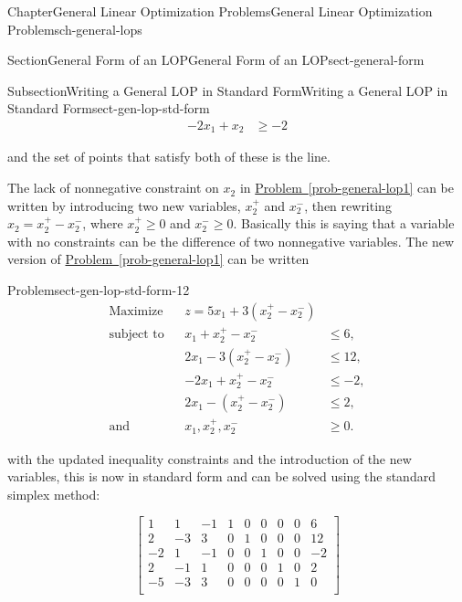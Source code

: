\documentclass[oneside,10pt,]{book}
\newcommand{\xreffont}{\relax}
\numberwithin{equation}{section}
\newcommand{\amp}{&}
\begin{document}
\begin{chapterptx}{Chapter}{General Linear Optimization Problems}{}{General Linear Optimization Problems}{}{}{ch-general-lops}
\begin{sectionptx}{Section}{General Form of an LOP}{}{General Form of an LOP}{}{}{sect-general-form}
\begin{subsectionptx}{Subsection}{Writing a General LOP in Standard Form}{}{Writing a General LOP in Standard Form}{}{}{sect-gen-lop-std-form}
\begin{align*}
-2 x_1 + x_2 \amp \geq -2
\end{align*}
%
\par
and the set of points that satisfy both of these is the line.%
\par
The lack of nonnegative constraint on \(x_2\) in \hyperref[prob-general-lop1]{Problem~{\xreffont\ref{prob-general-lop1}}} can be written by introducing two new variables, \(x_2^+\) and \(x_2^-\), then rewriting \(x_2 = x_2^+-x_2^-\), where \(x_2^+ \geq 0\) and \(x_2^- \geq 0\). Basically this is saying that a variable with no constraints can be the difference of two nonnegative variables. The new version of \hyperref[prob-general-lop1]{Problem~{\xreffont\ref{prob-general-lop1}}} can be written%
\begin{problem}{Problem}{}{sect-gen-lop-std-form-12}%
%
\begin{equation*}
\begin{aligned} \text{Maximize} \amp\amp z = 5x_1 +3(x_2^+ - x_2^-) \amp \\ \text{subject to} \amp\amp x_1 + x_2^+ - x_2^- \amp \leq 6, \\ \amp\amp 2x_1 -3(x_2^+ - x_2^-)  \amp \leq 12, \\ \amp\amp -2x_1 + x_2^+ - x_2^- \amp\leq -2, \\ \amp\amp 2x_1 - (x_2^+ - x_2^-) \amp \leq 2, \\ \text{and}\amp\amp x_1, x_2^+, x_2^- \amp \geq 0.
\end{aligned}
\end{equation*}
%
\end{problem}
with the updated inequality constraints and the introduction of the new variables, this is now in standard form and can be solved using the standard simplex method:%
\par
%
\begin{equation*}
\left[\begin{array}{rrr|rrrrr|r} 1 \amp 1 \amp -1 \amp 1 \amp 0 \amp 0 \amp 0 \amp 0 \amp 6\\ 2 \amp -3 \amp 3 \amp 0 \amp 1 \amp 0 \amp 0 \amp 0 \amp 12\\ -2 \amp 1 \amp -1 \amp 0 \amp 0 \amp 1 \amp 0 \amp 0 \amp -2\\ 2 \amp -1 \amp 1 \amp 0 \amp 0 \amp 0 \amp 1 \amp 0 \amp 2\\ \hline -5 \amp -3 \amp 3 \amp 0 \amp 0 \amp 0 \amp 0 \amp 1 \amp 0\\ \end{array} \right]
\end{equation*}

\end{subsectionptx}
\end{sectionptx}
\end{chapterptx}
\end{document}
